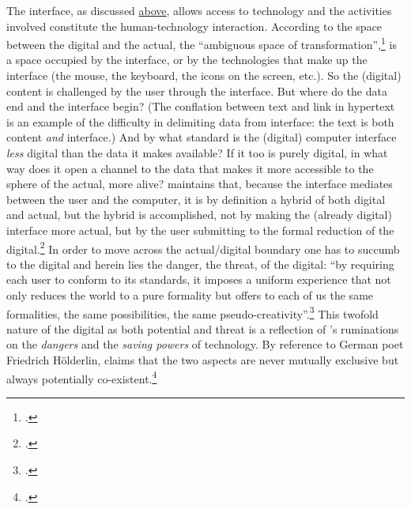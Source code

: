 \label{sec:interaction-digital-1}
The interface, as discussed \hyperref[sec:human-comp-inter]{above}, allows access to technology and the activities involved constitute the human-technology interaction. According to \citeauthor{evens05} the space between the digital and the actual, the ``ambiguous space of transformation'',\footcite[80]{evens05} is a space occupied by the interface, or by the technologies that make up the interface (the mouse, the keyboard, the icons on the screen, etc.). So the (digital) content is challenged by the user through the interface. But where do the data end and the interface begin? (The conflation between text and link in hypertext is an example of the difficulty in delimiting data from interface: the text is both content \emph{and} interface.) And by what standard is the (digital) computer interface \emph{less} digital than the data it makes available? If it too is purely digital, in what way does it open a channel to the data that makes it more accessible to the sphere of the actual, more alive? \citeauthor{evens05} maintains that, because the interface mediates between the user and the computer, it is by definition a hybrid of both digital and actual, but the hybrid is accomplished, not by making the (already digital) interface more actual, but by the user submitting to the formal reduction of the digital.\footcite[80]{evens05} In order to move across the actual/digital boundary one has to succumb to the digital and herein lies the danger, the threat, of the digital: ``by requiring each user to conform to its standards, it imposes a uniform experience that not only reduces the world to a pure formality but offers to each of us the same formalities, the same possibilities, the same pseudo-creativity''.\footcite[81]{evens05} This twofold nature of the digital as both potential and threat is a reflection of \citeauthor{heidegger93}'s ruminations on the \emph{dangers} and the \emph{saving powers} of technology. By reference to German poet Friedrich H\"{o}lderlin, \citeauthor{heidegger93} claims that the two aspects are never mutually exclusive but always potentially co-existent.\footcite[The lines by H\"{o}lderlin are: ``But where danger is, grows / The saving power also''. Quoted in][333]{heidegger93}

